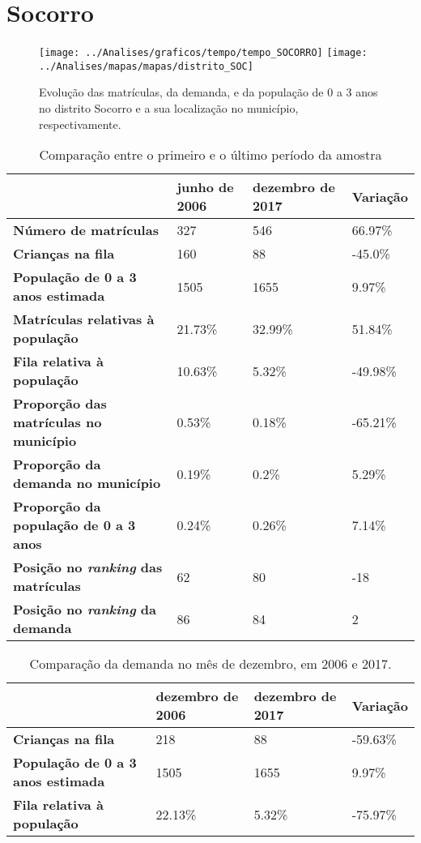 \section{Socorro}
\begin{figure}[H]
\centering
\texttt{[image: ../Analises/graficos/tempo/tempo\_SOCORRO]}
\texttt{[image: ../Analises/mapas/mapas/distrito\_SOC]}
\caption{Evolução das matrículas, da demanda, e da população de 0 a 3 anos no distrito Socorro e a sua localização no município, respectivamente.}
\end{figure}
\begin{table}[H]
\begin{tabular}{l|l|l|l}
\textbf{}                                      & \textbf{junho de 2006}       & \textbf{dezembro de 2017}    & \textbf{Variação} \\ \hline
\textbf{Número de matrículas}                  & 327 & 546 & 66.97\% \\ \hline
\textbf{Crianças na fila}                      & 160 & 88 & -45.0\% \\ \hline
\textbf{População de 0 a 3 anos estimada}      & 1505 & 1655 & 9.97\% \\ \hline
\textbf{Matrículas relativas à população}      & 21.73\% & 32.99\% & 51.84\% \\ \hline
\textbf{Fila relativa à população}             & 10.63\% & 5.32\% & -49.98\% \\ \hline
\textbf{Proporção das matrículas no município} & 0.53\% & 0.18\% & -65.21\% \\ \hline
\textbf{Proporção da demanda no município}     & 0.19\% & 0.2\% & 5.29\% \\ \hline
\textbf{Proporção da população de 0 a 3 anos}  & 0.24\% & 0.26\% & 7.14\% \\ \hline
\textbf{Posição no \textit{ranking} das matrículas}     & 62 & 80 & -18 \\ \hline
\textbf{Posição no \textit{ranking} da demanda}         & 86 & 84 & 2 \\ 
\end{tabular}
\caption{Comparação entre o primeiro e o último período da amostra}
\end{table}
\begin{table}[H]
\begin{tabular}{l|l|l|l}
\textbf{}                                 & \textbf{dezembro de 2006} & \textbf{dezembro de 2017} & \textbf{Variação} \\ \hline
\textbf{Crianças na fila}                      & 218 & 88 & -59.63\% \\ \hline
\textbf{População de 0 a 3 anos estimada}      & 1505 & 1655 & 9.97\% \\ \hline
\textbf{Fila relativa à população}             & 22.13\% & 5.32\% & -75.97\% \\
\end{tabular}
\caption{Comparação da demanda no mês de dezembro, em 2006 e 2017.}
\end{table}
